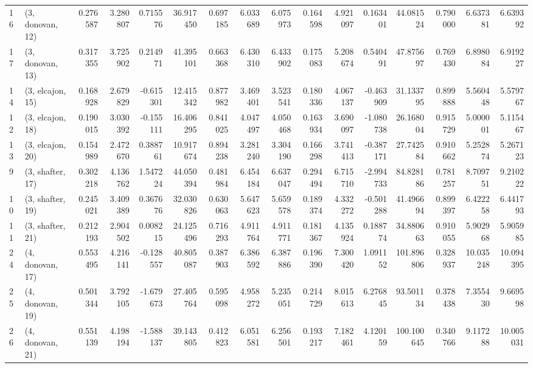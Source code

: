 \begin{tabular}{llrrrrrrrrrrrrrr}
16 &  (3, donovan, 12) &   0.276587 &  3.280807 &  0.715576 &  36.917450 &  0.697185 &   6.033689 &  6.075973 &  0.164598 &  4.921097 &  0.163401 &   44.081524 &  0.790000 &   6.637381 &   6.639392 \\
17 &  (3, donovan, 13) &   0.317355 &  3.725902 &  0.214971 &  41.395101 &  0.663368 &   6.430310 &  6.433902 &  0.175083 &  5.208674 &  0.540491 &   47.875697 &  0.769430 &   6.898084 &   6.919227 \\
14 &  (3, elcajon, 15) &   0.168928 &  2.679829 & -0.615301 &  12.415342 &  0.877982 &   3.469401 &  3.523541 &  0.180336 &  4.067137 & -0.463909 &   31.133795 &  0.899888 &   5.560448 &   5.579767 \\
12 &  (3, elcajon, 18) &   0.190015 &  3.030392 & -0.155111 &  16.406295 &  0.841025 &   4.047497 &  4.050468 &  0.163934 &  3.690097 & -1.080738 &   26.168004 &  0.915729 &   5.000001 &   5.115467 \\
13 &  (3, elcajon, 20) &   0.154989 &  2.472670 &  0.388761 &  10.917674 &  0.894238 &   3.281240 &  3.304190 &  0.166298 &  3.741413 & -0.387171 &   27.742584 &  0.910662 &   5.252874 &   5.267123 \\
9  &  (3, shafter, 17) &   0.302218 &  4.136762 &  1.547224 &  44.050394 &  0.481984 &   6.454184 &  6.637047 &  0.294494 &  6.715710 & -2.994733 &   84.828186 &  0.781257 &   8.709751 &   9.210222 \\
10 &  (3, shafter, 19) &   0.245021 &  3.409389 &  0.367676 &  32.030826 &  0.630063 &   5.647623 &  5.659578 &  0.189374 &  4.332272 & -0.501288 &   41.496694 &  0.899397 &   6.422258 &   6.441793 \\
11 &  (3, shafter, 21) &   0.212193 &  2.904502 &  0.008215 &  24.125496 &  0.716293 &   4.911764 &  4.911771 &  0.181367 &  4.135924 &  0.188774 &   34.880663 &  0.910055 &   5.902968 &   5.905985 \\
24 &  (4, donovan, 17) &   0.553495 &  4.216141 & -0.128557 &  40.805087 &  0.387903 &   6.386592 &  6.387886 &  0.196390 &  7.300420 &  1.091152 &  101.896806 &  0.328937 &  10.035248 &  10.094395 \\
25 &  (4, donovan, 19) &   0.501344 &  3.792105 & -1.679673 &  27.405764 &  0.595098 &   4.958272 &  5.235051 &  0.214729 &  8.015613 &  6.276845 &   93.501134 &  0.378438 &   7.355430 &   9.669598 \\
26 &  (4, donovan, 21) &   0.551139 &  4.198194 & -1.588137 &  39.143805 &  0.412823 &   6.051581 &  6.256501 &  0.193217 &  7.182461 &  4.120159 &  100.100645 &  0.340766 &   9.117288 &  10.005031 \\

\end{tabular}

